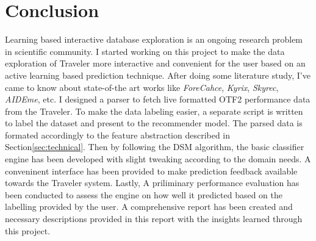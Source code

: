 \section{Conclusion}
\label{sec:summary}
Learning based interactive database exploration is an ongoing research problem in scientific community. I started working on this project to make the data
exploration of Traveler more interactive and convenient for the user based on an active learning based prediction technique. After doing some literature
study, I've came to know about state-of-the art works like \emph{ForeCahce}\cite{battle2016dynamic}, \emph{Kyrix}\cite{tao2019kyrix},
\emph{Skyrec}\cite{liu2019improvement}, \emph{AIDEme}\cite{huang2019aideme}, etc. I designed a parser to fetch live formatted OTF2 performance data from
the Traveler. To make the data labeling easier, a separate script is written to label the dataset and present to the recommender model. The parsed data is
formated accordingly to the feature abstraction described in Section\ref{sec:technical}. Then by following the DSM algorithm, the basic classifier engine has
been developed with slight tweaking according to the domain needs. A conveninent interface has been provided to make prediction feedback available towards
the Traveler system. Lastly, A priliminary performance evaluation has been conducted to assess the engine on how well it predicted based on the labelling
provided by the user. A comprehensive report has been created and necessary descriptions provided in this report with the insights learned through this
project.